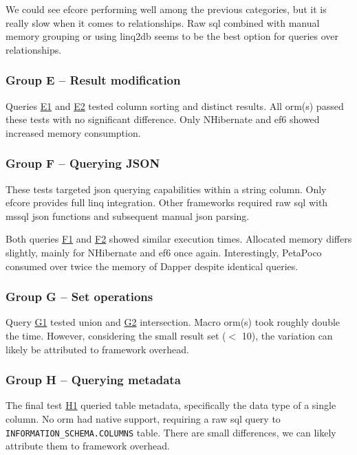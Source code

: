 We could see \acrshort{efcore} performing well among the previous categories, but it is really slow when it comes to relationships. Raw \acrshort{sql} combined with manual memory grouping or using linq2db seems to be the best option for queries over relationships.

\subsubsection{Group E -- Result modification}
Queries \hyperref[query:e1]{E1} and \hyperref[query:e2]{E2} tested column sorting and distinct results. All \acrshort{orm}(s) passed these tests with no significant difference. Only NHibernate and \acrshort{ef}6 showed increased memory consumption. 

\subsubsection{Group F -- Querying JSON}
These tests targeted \acrshort{json} querying capabilities within a string column. Only \acrshort{efcore} provides full \acrshort{linq} integration. Other frameworks required raw \acrshort{sql} with \acrshort{mssql} \acrshort{json} functions and subsequent manual \acrshort{json} parsing.

Both queries \hyperref[query:f1]{F1} and \hyperref[query:f2]{F2} showed similar execution times. Allocated memory differs slightly, mainly for NHibernate and \acrshort{ef}6 once again. Interestingly, PetaPoco consumed over twice the memory of Dapper despite identical queries.

\subsubsection{Group G -- Set operations}
Query \hyperref[query:g1]{G1} tested union and \hyperref[query:g2]{G2} intersection. Macro \acrshort{orm}(s) took roughly double the time. However, considering the small result set ($<$ 10), the variation can likely be attributed to framework overhead.

\subsubsection{Group H -- Querying metadata}
The final test \hyperref[query:h1]{H1} queried table metadata, specifically the data type of a single column. No \acrshort{orm} had native support, requiring a raw \acrshort{sql} query to \texttt{INFORMATION\_SCHEMA.COLUMNS} table. There are small differences, we can likely attribute them to framework overhead.

